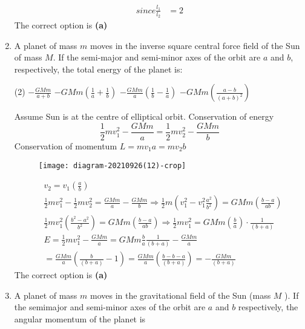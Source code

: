 \begin{enumerate}
\begin{answer}
\begin{align*}
	since \frac{l_{1}}{l_{2}}&=2
	\end{align*}
	The correct option is \textbf{(a)}
\end{answer}
	\item A planet of mass $m$ moves in the inverse square central force field of the Sun of mass $M$. If the semi-major and semi-minor axes of the orbit are $a$ and $b$, respectively, the total energy of the planet is:
	{}
\begin{tasks}(2)
	\task[\textbf{A.}] $-\frac{G M m}{a+b}$
	\task[\textbf{B.}]$-G M m\left(\frac{1}{a}+\frac{1}{b}\right)$
	\task[\textbf{C.}]$-\frac{G M m}{a}\left(\frac{1}{b}-\frac{1}{a}\right)$
	\task[\textbf{D.}]$-G M m\left(\frac{a-b}{(a+b)^{2}}\right)$
\end{tasks}
\begin{answer}
 Assume Sun is at the centre of elliptical orbit. Conservation of energy\\
  $$\frac{1}{2} m v_{1}^{2}-\frac{G M m}{a}=\frac{1}{2} m v_{2}^{2}-\frac{G M m}{b}$$ Conservation of momentum $L=m v_{1} a=m v_{2} b$\\
  \begin{figure}[H]
  	\centering
  	\texttt{[image: diagram-20210926(12)-crop]}
  \end{figure}
 \begin{align*}
 	&v_{2}=v_{1}\left(\frac{a}{b}\right) \\
 	&\frac{1}{2} m v_{1}^{2}-\frac{1}{2} m v_{2}^{2}=\frac{G M m}{a}-\frac{G M m}{b} \Rightarrow \frac{1}{2} m\left(v_{1}^{2}-v_{1}^{2} \frac{a^{2}}{b^{2}}\right)=G M m\left(\frac{b-a}{a b}\right) \\
 	&\frac{1}{2} m v_{1}^{2}\left(\frac{b^{2}-a^{2}}{b^{2}}\right)=G M m\left(\frac{b-a}{a b}\right) \Rightarrow \frac{1}{2} m v_{1}^{2}=G M m\left(\frac{b}{a}\right) \cdot \frac{1}{(b+a)} \\
 	&E=\frac{1}{2} m v_{1}^{2}-\frac{G M m}{a}=G M m \frac{b}{a} \frac{1}{(b+a)}-\frac{G M m}{a} \\
 	&=\frac{G M m}{a}\left(\frac{b}{(b+a)}-1\right)=\frac{G M m}{a}\left(\frac{b-b-a}{(b+a)}\right)=-\frac{G M m}{(b+a)}
 \end{align*}
 The correct option is \textbf{(a)}	
\end{answer}

	\item A planet of mass $m$ moves in the gravitational field of the Sun (mass $M$ ). If the semimajor and semi-minor axes of the orbit are $a$ and $b$ respectively, the angular momentum of the planet is
	{}


\end{enumerate}
